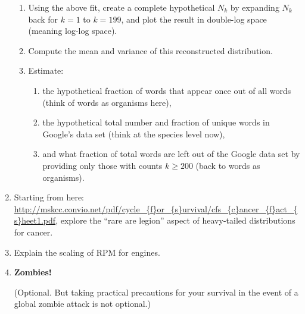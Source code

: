 \begin{enumerate}
  \begin{enumerate}
  \item 
    Using the above fit, create a complete hypothetical $N_{k}$ 
    by expanding $N_{k}$ back for $k=1$ to $k=199$, and plot
    the result in double-log space (meaning log-log space).
  \item 
    Compute the mean and variance of this reconstructed distribution.
  \item 
    Estimate:
    \begin{enumerate}
    \item 
      the hypothetical fraction of words that appear once
      out of all words
      (think of words as organisms here),
    \item 
      the hypothetical total number and fraction of unique words in
      Google's data set (think at the species level now),
    \item 
      and what fraction of total words are left out of the Google data set
      by providing only those with counts $k \ge 200$ (back to words as organisms).
    \end{enumerate}
  \end{enumerate}

  
   \solutionstart


   \solutionend





  
  

\item

  Starting from here:
  \url{http://mskcc.convio.net/pdf/cycle_{f}or_{s}urvival/cfs_{c}ancer_{f}act_{s}heet1.pdf},
  explore the ``rare are legion'' aspect of heavy-tailed distributions for cancer.

  
   \solutionstart


   \solutionend
  
\item

  Explain the scaling of RPM for engines.

  
   \solutionstart


   \solutionend

\item
  \textbf{Zombies!} 

  (Optional.  But taking practical precautions for your survival in
  the event of a global zombie attack is not optional.)


\end{enumerate}

